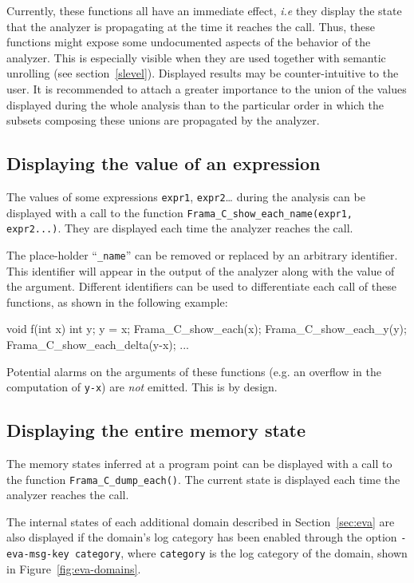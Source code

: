 \documentclass{frama-c-book}
\begin{document}
Currently, these functions all have an immediate effect, {\it i.e} they display
the state that the analyzer is propagating at the time it reaches the
call. Thus, these functions might expose some undocumented aspects of the
behavior of the analyzer. This is especially visible when they are used together
with semantic unrolling (see section~\ref{slevel}). Displayed results may be
counter-intuitive to the user. It is recommended to attach a greater importance
to the union of the values displayed during the whole analysis than to the
particular order in which the subsets composing these unions are propagated
by the analyzer.

\subsection{Displaying the value of an expression}

The values of some expressions \lstinline|expr1|, \lstinline|expr2|… during the
analysis can be displayed with a call to the function
\lstinline|Frama_C_show_each_name(expr1, expr2...)|. They are displayed each
time the analyzer reaches the call.

The place-holder ``\lstinline|_name|'' can be removed or replaced by an arbitrary
identifier.  This identifier will appear in the output of the analyzer along
with the value of the argument. Different identifiers can be used to
differentiate each call of these functions, as shown in the following example:

\begin{listing-nonumber}
void f(int x)
{
  int y;
  y = x;
  Frama_C_show_each(x);
  Frama_C_show_each_y(y);
  Frama_C_show_each_delta(y-x);
  ...
}
\end{listing-nonumber}

Potential alarms on the arguments of these functions (e.g. an overflow
in the computation of \lstinline|y-x|) are \emph{not} emitted. This is
by design.

\subsection{Displaying the entire memory state}

The memory states inferred at a program point can be displayed with a call to
the function \lstinline|Frama_C_dump_each()|. The current state is displayed
each time the analyzer reaches the call.

The internal states of each additional domain described in Section~\ref{sec:eva}
are also displayed if the domain's log category has been enabled through the
option \verb+-eva-msg-key category+, where \verb+category+ is the log category
of the domain, shown in Figure~\ref{fig:eva-domains}.
\end{document}
